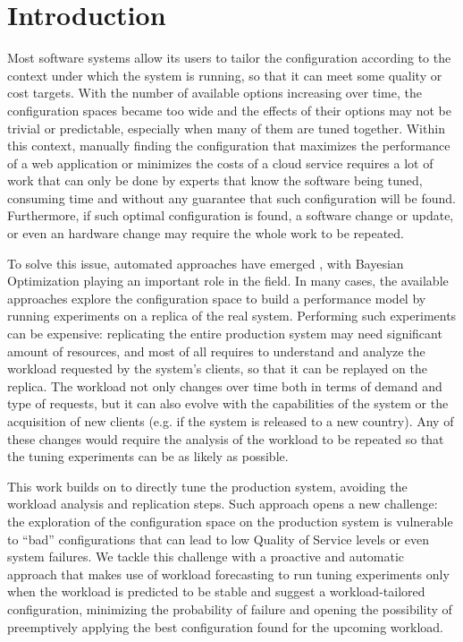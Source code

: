 \documentclass[a4paper, 12pt]{article} %
\begin{document}
	\section{ Introduction }
	Most software systems allow its users to tailor the configuration according to the context under which the system is running, so that it can meet some quality or cost targets. With the number of available options increasing over time, the configuration spaces became too wide and the effects of their options may not be trivial or predictable, especially when many of them are tuned together. Within this context, manually finding the configuration that maximizes the performance of a web application or minimizes the costs of a cloud service requires a lot of work that can only be done by experts that know the software being tuned, consuming time and without any guarantee that such configuration will be found. Furthermore, if such optimal configuration is found, a software change or update, or even an hardware change may require the whole work to be repeated.
	
	To solve this issue, automated approaches have emerged \cite{AkamasCGP, LearningToSample, OtterTune, OtterTune2}, with Bayesian Optimization playing an important role in the field. In many cases, the available approaches explore the configuration space to build a performance model by running experiments on a replica of the real system. Performing such experiments can be expensive: replicating the entire production system may need significant amount of resources, and most of all requires to understand and analyze the workload requested by the system's clients, so that it can be replayed on the replica. The workload not only changes over time both in terms of demand and type of requests, but it can also evolve with the capabilities of the system or the acquisition of new clients (e.g. if the system is released to a new country). Any of these changes would require the analysis of the workload to be repeated so that the tuning experiments can be as likely as possible.
	
	This work builds on \cite{AkamasCGP} to directly tune the production system, avoiding the workload analysis and replication steps. Such approach opens a new challenge: the exploration of the configuration space on the production system is vulnerable to ``bad'' configurations that can lead to low Quality of Service levels or even system failures.  We tackle this challenge with a proactive and automatic approach that makes use of workload forecasting to run tuning experiments only when the workload is predicted to be stable and suggest a workload-tailored configuration, minimizing the probability of failure and opening the possibility of preemptively applying the best configuration found for the upcoming workload. 
	
\end{document}
